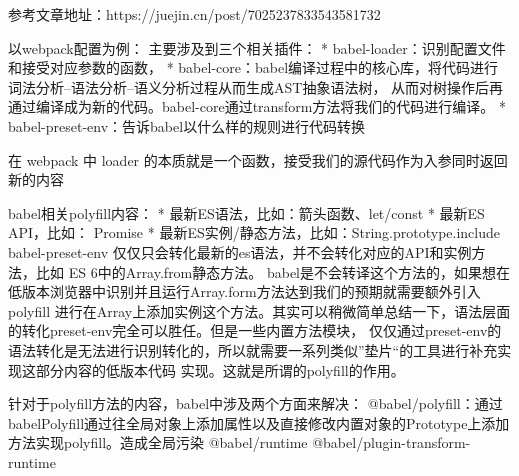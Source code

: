 参考文章地址：https://juejin.cn/post/7025237833543581732

以webpack配置为例：
主要涉及到三个相关插件：
* babel-loader：识别配置文件和接受对应参数的函数，
* babel-core：babel编译过程中的核心库，将代码进行词法分析--语法分析--语义分析过程从而生成AST抽象语法树，
  从而对树操作后再通过编译成为新的代码。babel-core通过transform方法将我们的代码进行编译。
* babel-preset-env：告诉babel以什么样的规则进行代码转换

在 webpack 中 loader 的本质就是一个函数，接受我们的源代码作为入参同时返回新的内容


babel相关polyfill内容：
* 最新ES语法，比如：箭头函数、let/const
* 最新ES API，比如： Promise
* 最新ES实例/静态方法，比如：String.prototype.include
babel-preset-env 仅仅只会转化最新的es语法，并不会转化对应的API和实例方法，比如 ES 6中的Array.from静态方法。
babel是不会转译这个方法的，如果想在低版本浏览器中识别并且运行Array.form方法达到我们的预期就需要额外引入 polyfill
进行在Array上添加实例这个方法。其实可以稍微简单总结一下，语法层面的转化preset-env完全可以胜任。但是一些内置方法模块，
仅仅通过preset-env的语法转化是无法进行识别转化的，所以就需要一系列类似”垫片“的工具进行补充实现这部分内容的低版本代码
实现。这就是所谓的polyfill的作用。

针对于polyfill方法的内容，babel中涉及两个方面来解决：
@babel/polyfill：通过babelPolyfill通过往全局对象上添加属性以及直接修改内置对象的Prototype上添加方法实现polyfill。造成全局污染
@babel/runtime
@babel/plugin-transform-runtime

